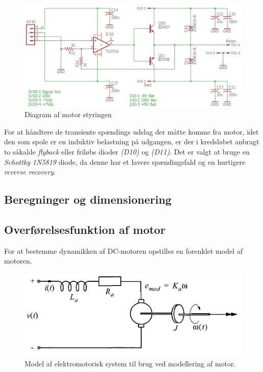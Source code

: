 \begin{figure}[h!]
	\centering
	\includegraphics[width=1\textwidth]{billeder/motor_cont_schematic.png}
	\caption{Diagram af motor styringen}
	\label{fig:motor_diagram}
\end{figure}
\FloatBlock

For at håndtere de transiente spændings udslag der måtte komme fra motor, idet den som spole er en induktiv belastning på udgangen, er der i kredsløbet anbragt to såkalde \textit{flyback} eller friløbs dioder \emph{(D10)} og \emph{(D11)}.
Det er valgt at bruge en \textit{Schottky} \emph{1N5819} diode, da denne har et lavere spændingsfald og en hurtigere \textit{reverse recovery}.


\subsection{Beregninger og dimensionering}



\subsection{Overførelsesfunktion af motor}
For at bestemme dynamikken af DC-motoren opstilles en forenklet model af motoren.

\begin{figure}[h!]
	\centering
	\includegraphics[width=.6\textwidth]{billeder/motor_model.png}
	\caption[Model af elektromotorisk system til brug ved modellering af motor]{Model af elektromotorisk system til brug ved modellering af motor\protect\footnotemark.}
	\label{fig:motor_model}
\end{figure}
\FloatBlock
{}

